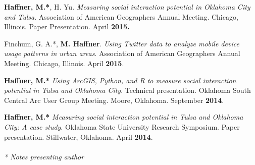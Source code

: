 \begin{cventries}
{\begin{cvitems}
            \end{cvitems}
            }
   \cventry
      {}
      {}
      {}
      {}
      {
        \begin{cvitems}
            \item {\textbf{Haffner, M.*}, H. Yu. \textit{Measuring social interaction potential in Oklahoma City and Tulsa}. Association of American Geographers Annual Meeting. Chicago, Illinois. Paper Presentation. April \textbf{2015.}} 
              \end{cvitems}
              }
   \cventry
      {}
      {}
      {}
      {}
      {
        \begin{cvitems}
            \item {Finchum, G. A.*, \textbf{M. Haffner}. \textit{Using Twitter data to analyze mobile device usage patterns in urban areas}. Association of American Geographers Annual Meeting. Chicago, Illinois. April \textbf{2015}.}  
              \end{cvitems}
            }
   \cventry
      {}
      {}
      {}
      {}
      {
        \begin{cvitems}
            \item {\textbf{Haffner, M.*} \textit{Using ArcGIS, Python, and R to measure social interaction potential in Tulsa and Oklahoma City}. Technical presentation. Oklahoma South Central Arc User Group Meeting. Moore, Oklahoma. September \textbf{2014}.} 
            \end{cvitems}
            }
   \cventry
      {}
      {}
      {}
      {}
      {
        \begin{cvitems}
            \item {\textbf{Haffner, M.*} \textit{Measuring social interaction potential in Tulsa and Oklahoma City: A case study}. Oklahoma State University Research Symposium. Paper presentation. Stillwater, Oklahoma. April \textbf{2014}.} \\\\
            \textit{* Notes presenting author}
              \end{cvitems}
            }
\end{cventries}